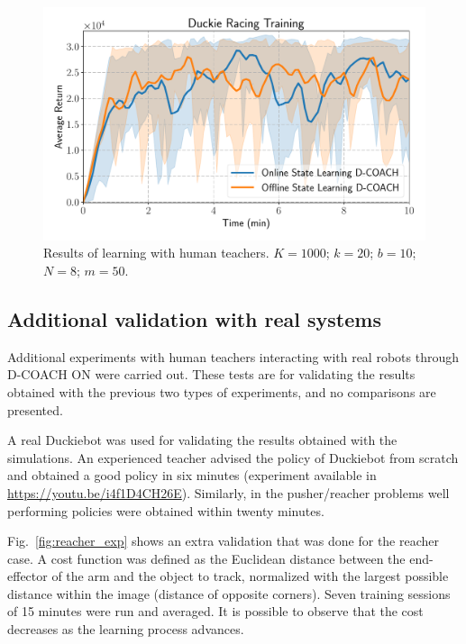 \begin{figure}[H]
    \centering
    \includegraphics[width=0.9\linewidth]{imagenes/cap3/duckie_human_teacher_ICRA.pdf}
    \caption{Results of learning with human teachers. $K = 1000$; $k=20$; $b = 10$; $N = 8$; $m=50$.}
    \label{fig:humanteachers2}
\end{figure}

\subsection{Additional validation with real systems}

Additional experiments with human teachers interacting with real robots through D-COACH ON were carried out. These tests are for validating the results obtained with the previous two types of experiments, and no comparisons are presented.

A real Duckiebot was used for validating the results obtained with the simulations. An experienced teacher advised the policy of Duckiebot from scratch and obtained a good policy in six minutes (experiment available in \url{https://youtu.be/i4f1D4CH26E}). Similarly, in the pusher/reacher problems well performing policies were obtained within twenty minutes. 

Fig.~\ref{fig:reacher_exp} shows an extra validation that was done for the reacher case. A cost function was defined as the Euclidean distance between the end-effector of the arm and the object to track, normalized with the largest possible distance within the image (distance of opposite corners). Seven training sessions of 15 minutes were run and averaged. It is possible to observe that the cost decreases as the learning process advances. 

